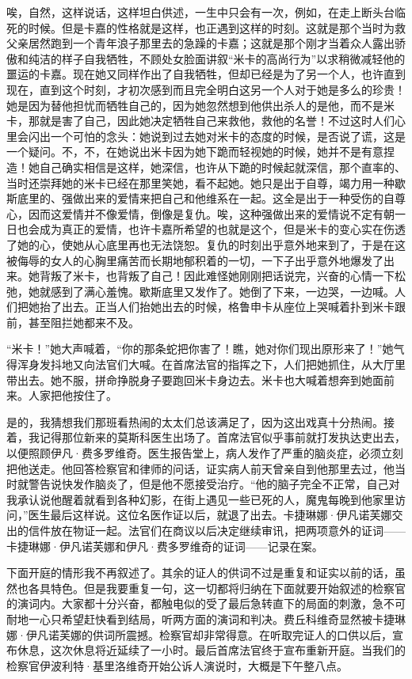 \par 唉，自然，这样说话，这样坦白供述，一生中只会有一次，例如，在走上断头台临死的时候。但是卡嘉的性格就是这样，也正遇到这样的时刻。这就是那个当时为救父亲居然跑到一个青年浪子那里去的急躁的卡嘉；这就是那个刚才当着众人露出骄傲和纯洁的样子自我牺牲，不顾处女脸面讲叙“米卡的高尚行为”以求稍微减轻他的噩运的卡嘉。现在她又同样作出了自我牺牲，但却已经是为了另一个人，也许直到现在，直到这个时刻，才初次感到而且完全明白这另一个人对于她是多么的珍贵！她是因为替他担忧而牺牲自己的，因为她忽然想到他供出杀人的是他，而不是米卡，那就是害了自己，因此她决定牺牲自己来救他，救他的名誉！不过这时人们心里会闪出一个可怕的念头：她说到过去她对米卡的态度的时候，是否说了谎，这是一个疑问。不，不，在她说出米卡因为她下跪而轻视她的时候，她并不是有意捏造！她自己确实相信是这样，她深信，也许从下跪的时候起就深信，那个直率的、当时还崇拜她的米卡已经在那里笑她，看不起她。她只是出于自尊，竭力用一种歇斯底里的、强做出来的爱情来把自己和他维系在一起。这全是出于一种受伤的自尊心，因而这爱情并不像爱情，倒像是复仇。唉，这种强做出来的爱情说不定有朝一日也会成为真正的爱情，也许卡嘉所希望的也就是这个，但是米卡的变心实在伤透了她的心，使她从心底里再也无法饶恕。复仇的时刻出乎意外地来到了，于是在这被侮辱的女人的心胸里痛苦而长期地郁积着的一切，一下子出乎意外地爆发了出来。她背叛了米卡，也背叛了自己！因此难怪她刚刚把话说完，兴奋的心情一下松弛，她就感到了满心羞愧。歇斯底里又发作了。她倒了下来，一边哭，一边喊。人们把她抬了出去。正当人们抬她出去的时候，格鲁申卡从座位上哭喊着扑到米卡跟前，甚至阻拦她都来不及。
\par “米卡！”她大声喊着，“你的那条蛇把你害了！瞧，她对你们现出原形来了！”她气得浑身发抖地又向法官们大喊。在首席法官的指挥之下，人们把她抓住，从大厅里带出去。她不服，拼命挣脱身子要跑回米卡身边去。米卡也大喊着想奔到她面前来。人家把他按住了。
\par 是的，我猜想我们那班看热闹的太太们总该满足了，因为这出戏真十分热闹。接着，我记得那位新来的莫斯科医生出场了。首席法官似乎事前就打发执达吏出去，以便照顾伊凡·费多罗维奇。医生报告堂上，病人发作了严重的脑炎症，必须立刻把他送走。他回答检察官和律师的问话，证实病人前天曾亲自到他那里去过，他当时就警告说快发作脑炎了，但是他不愿接受治疗。“他的脑子完全不正常，自己对我承认说他醒着就看到各种幻影，在街上遇见一些已死的人，魔鬼每晚到他家里访问，”医生最后这样说。这位名医作证以后，就退了出去。卡捷琳娜·伊凡诺芙娜交出的信件放在物证一起。法官们在商议以后决定继续审讯，把两项意外的证词——卡捷琳娜·伊凡诺芙娜和伊凡·费多罗维奇的证词——记录在案。
\par 下面开庭的情形我不再叙述了。其余的证人的供词不过是重复和证实以前的话，虽然也各具特色。但是我要重复一句，这一切都将归纳在下面就要开始叙述的检察官的演词内。大家都十分兴奋，都触电似的受了最后急转直下的局面的刺激，急不可耐地一心只希望赶快看到结局，听两方面的演词和判决。费丘科维奇显然被卡捷琳娜·伊凡诺芙娜的供词所震撼。检察官却非常得意。在听取完证人的口供以后，宣布休息，这次休息将近延续了一小时。最后首席法官终于宣布重新开庭。当我们的检察官伊波利特·基里洛维奇开始公诉人演说时，大概是下午整八点。
